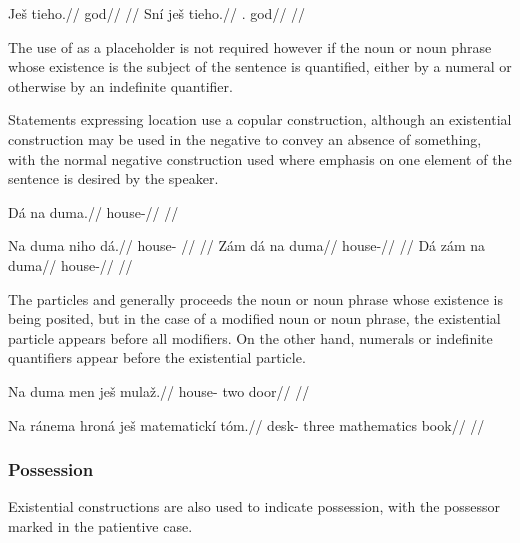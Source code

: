 \begin{multicols}{2}
\pex
\a\begingl
\gla \ljudge{*}Ješ tieho.//
\glb \Exst{} god//
\glft {}//
\endgl
\a\begingl
\gla Sní ješ tieho.//
\glb \Refl{}.\Acc{} \Exst{} god//
\glft {}//
\endgl
\xe
\end{multicols}

The use of  as a placeholder is not required however if the noun or noun phrase whose existence is the subject of the sentence is quantified, either by a numeral or otherwise by an indefinite quantifier.

Statements expressing location use a copular construction, although an existential construction may be used in the negative to convey an absence of something, with the normal negative construction used where emphasis on one element of the sentence is desired by the speaker.

\pex
\begingl
\gla Dá na duma.//
\glb {} \Loc{} house-\Acc{}//
\glft {}//
\endgl
\xe

\pex
\a\begingl
\gla Na duma niho dá.//
\glb \Loc{} house-\Acc{} \N{}\Exst{} //
\glft {}//
\endgl
\a\begingl
\gla Z\'am d\'a na duma//
\glb \Neg{}  \Loc{} house-\Acc{}//
\glft {}//
\endgl
\a\begingl
\gla D\'a z\'am na duma//
\glb {} \Neg{} \Loc{} house-\Acc{}//
\glft {}//
\endgl
\xe

The particles  and  generally proceeds the noun or noun phrase whose existence is being posited, but in the case of a modified noun or noun phrase, the existential particle appears before all modifiers. On the other hand, numerals or indefinite quantifiers appear before the existential particle.

\pex
\begingl
\gla Na duma men ješ mulaž.//
\glb \Loc{} house-\Acc{} two \Exst{} door//
\glft {}//
\endgl
\xe

\pex
\begingl
\gla Na ránema hroná ješ matematick\'i t\'om.//
\glb \Loc{} desk-\Acc{} three \Exst{} mathematics book//
\glft {}//
\endgl
\xe




\subsubsection{Possession}
Existential constructions are also used to indicate possession, with the possessor marked in the patientive case.

